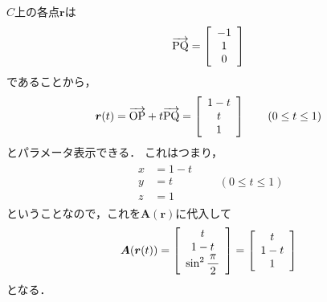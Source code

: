 $C$上の各点$\bm{r}$は
\begin{align*}
\overrightarrow{\mathrm{PQ}} = \left[
\renewcommand{\arraystretch}{1}
\begin{array}{c}
-1 \\
1 \\
0
\end{array}
\right]
\end{align*}
であることから，
\begin{align*}
\bm{r}(t) = \overrightarrow{\mathrm{OP}} + t \overrightarrow{\mathrm{PQ}} 
= \left[
\renewcommand{\arraystretch}{1}
\begin{array}{c} 
1 - t \\
t \\
1 
\end{array}
\right]
\qquad (0 \leq t \leq 1)
\end{align*}
とパラメータ表示できる．
これはつまり，
\begin{align*}
\begin{aligned}
x & = 1 - t \\
y & = t \\
z & = 1
\end{aligned}
\qquad (0 \leq t \leq 1)
\end{align*}
ということなので，これを$\bm{A}(\bm{r})$に代入して
\begin{align*}
\bm{A} ( \bm{r}(t) ) = \left[
\renewcommand{\arraystretch}{1}
\begin{array}{c} 
t \\
1- t \\
\displaystyle \sin^2 \frac{\pi}{2}
\end{array}
\right]
= \left[
\renewcommand{\arraystretch}{1}
\begin{array}{c}
t \\
1- t \\
1
\end{array}
\right]
\end{align*}
となる．

